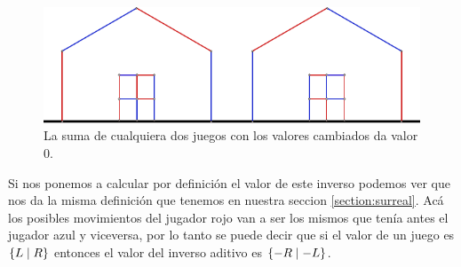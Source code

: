 \begin{figure}[h]
    \centering
    \includegraphics[width=.7\textwidth]{images/hackenbush-additive_inverse.pdf}
    \caption{La suma de cualquiera dos juegos con los valores cambiados da valor $0$.}
    \label{figure:hackenbush-add_inv}
\end{figure}

Si nos ponemos a calcular por definici\'on el valor de este inverso podemos ver que nos da la misma definici\'on que tenemos en nuestra seccion \ref{section:surreal}. Ac\'a los posibles movimientos del jugador rojo van a ser los mismos que ten\'ia antes el jugador azul y viceversa, por lo tanto se puede decir que si el valor de un juego es $\left\{L\;\middle|\; R\right\}$ entonces el valor del inverso aditivo es $\left\{-R\;\middle|\; -L\right\}$.
